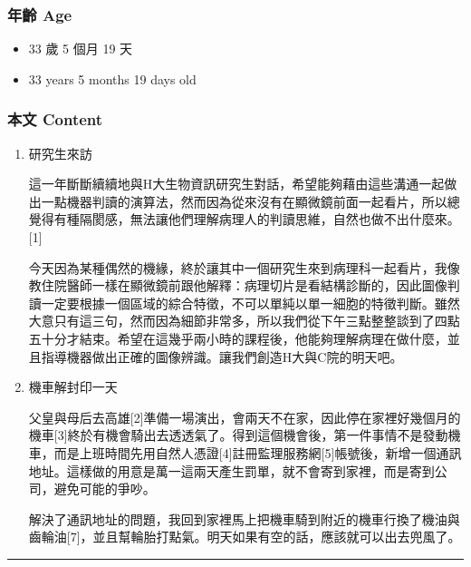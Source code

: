 \documentclass[
]{article}
\providecommand{\tightlist}{%
  \setlength{\itemsep}{0pt}\setlength{\parskip}{0pt}}
\begin{document}
\hypertarget{ux5e74ux9f61-age-12}{%
\subsubsection{年齡 Age}\label{ux5e74ux9f61-age-12}}

\begin{itemize}
\tightlist
\item
  33 歲 5 個月 19 天
\item
  33 years 5 months 19 days old
\end{itemize}

\hypertarget{ux672cux6587-content-12}{%
\subsubsection{本文 Content}\label{ux672cux6587-content-12}}

\begin{enumerate}
\def\labelenumi{\arabic{enumi}.}
\item
  研究生來訪

  這一年斷斷續續地與H大生物資訊研究生對話，希望能夠藉由這些溝通一起做出一點機器判讀的演算法，然而因為從來沒有在顯微鏡前面一起看片，所以總覺得有種隔閡感，無法讓他們理解病理人的判讀思維，自然也做不出什麼來。{[}1{]}

  今天因為某種偶然的機緣，終於讓其中一個研究生來到病理科一起看片，我像教住院醫師一樣在顯微鏡前跟他解釋：病理切片是看結構診斷的，因此圖像判讀一定要根據一個區域的綜合特徵，不可以單純以單一細胞的特徵判斷。雖然大意只有這三句，然而因為細節非常多，所以我們從下午三點整整談到了四點五十分才結束。希望在這幾乎兩小時的課程後，他能夠理解病理在做什麼，並且指導機器做出正確的圖像辨識。讓我們創造H大與C院的明天吧。
\item
  機車解封印一天

  父皇與母后去高雄{[}2{]}準備一場演出，會兩天不在家，因此停在家裡好幾個月的機車{[}3{]}終於有機會騎出去透透氣了。得到這個機會後，第一件事情不是發動機車，而是上班時間先用自然人憑證{[}4{]}註冊監理服務網{[}5{]}帳號後，新增一個通訊地址。這樣做的用意是萬一這兩天產生罰單，就不會寄到家裡，而是寄到公司，避免可能的爭吵。

  解決了通訊地址的問題，我回到家裡馬上把機車騎到附近的機車行換了機油與齒輪油{[}7{]}，並且幫輪胎打點氣。明天如果有空的話，應該就可以出去兜風了。
\end{enumerate}

\begin{center}\rule{0.5\linewidth}{\linethickness}\end{center}
\end{document}
